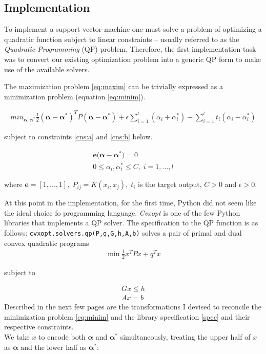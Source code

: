 \documentclass[12pt,notitlepage,twoside]{scrreprt}
\begin{document}
\subsection{Implementation}
To implement a support vector machine one must solve a problem of optimizing a quadratic
function subject to linear constraints -- usually referred to as the \textit{Quadratic
Programming} (QP) problem. Therefore, the first implementation task was to convert our
existing optimization problem into a generic QP form to make use of the available solvers.

The maximization problem \ref{eq:maxim} can be
trivially expressed as a minimization problem (equation \ref{eq:minim}).

\begin{gather}\label{eq:minim} min_{\bm{\alpha},\bm{\alpha^*}}
  \frac{1}{2}(\bm{\alpha-\alpha^*})^T P (\bm{\alpha - \alpha^*})+\epsilon
  \sum_{i=1}^{l}(\alpha_i+\alpha_i^*)-\sum_{i=1}^{l}t_i(\alpha_i-\alpha_i^*)
\end{gather}

subject to constraints \ref{cns:a} and \ref{cns:b} below.

\begin{gather} \mathbf{e(\bm{\alpha}}-\bm{\alpha^*})=0 \label{cns:a}\\ 0\leq
  \alpha_i,\alpha_i^* \leq C, \;i=1,...,l \label{cns:b} \end{gather}

where \(\mathbf{e}=[1,...,1],\;P_{ij}=K(x_i,x_j),\;t_i\) is the target output,
\(C > 0\) and \(\epsilon > 0.\) 

At this point in the
implementation, for the first time, Python did not seem like the ideal choice fo
programming language.
\textit{Cvxopt} is one of the few Python libraries that implements a QP solver.
The specification to the QP function is as follows:
\texttt{cvxopt.solvers.qp(P,q,G,h,A,b)} solves a pair of primal and dual convex
quadratic programs \begin{gather} \label{spec} \min \frac{1}{2} x^T P x + q^T x
\end{gather}

 subject to

\begin{gather} G x \leq h\\ Ax = b \end{gather} Described in the next few pages
are the transformations I devised to reconcile the minimization problem
\ref{eq:minim} and the library specification \ref{spec} and their respective
constraints.\\ We take \(x\) to encode both \(\bm{\alpha}\) and
\(\bm{\alpha^*}\) simultaneously, treating the upper half of \(x\) as
\(\bm{\alpha}\) and the lower half as \(\bm{\alpha^*}\):
\end{document}
